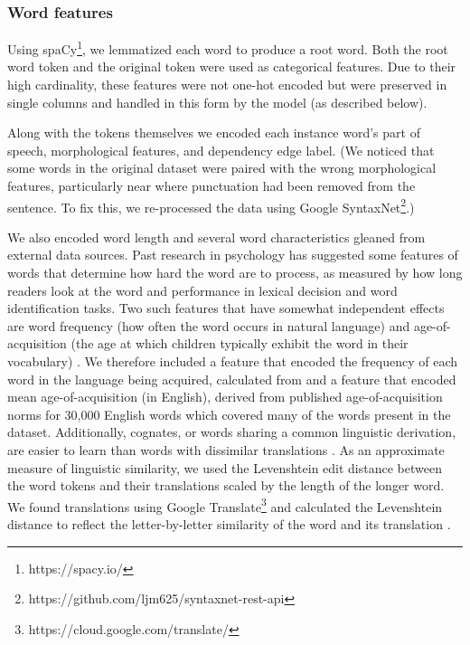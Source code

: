 \documentclass[11pt,a4paper]{article}
\begin{document}
\subsubsection{Word features}

Using spaCy\footnote{https://spacy.io/}, we lemmatized each word to produce a root word. Both the root
word token and the original token were used as categorical features. Due to
their high cardinality, these features were not one-hot encoded but were
preserved in single columns and handled in this form by the model (as described
below).

Along with the tokens themselves we encoded each instance word's part of speech,
morphological features, and dependency edge label. (We noticed that some words
in the original dataset were paired with the wrong morphological features,
particularly near where punctuation had been removed from the sentence. To fix
this, we re-processed the data using Google SyntaxNet\footnote{https://github.com/ljm625/syntaxnet-rest-api}.)

We also encoded word length and several word characteristics gleaned from
external data sources. Past research in psychology has suggested some features of words that determine how hard the word are to process, as measured by how long readers look at the word and performance in lexical decision and word identification tasks. Two such features that have somewhat independent effects are word frequency (how often the word occurs in natural language) \cite{rayner1998eye} and age-of-acquisition (the age at which children typically exhibit the word in their vocabulary) \cite{brysbaert2011effects, ferrand2011comparing}. We therefore included a feature that encoded the frequency of each word in the language being acquired, calculated from \citet{robert_speer_2017_998161} and a feature that encoded mean age-of-acquisition (in English), derived from published age-of-acquisition norms for 30,000 English words \cite{Kuperman2012} which covered many of the words present in the dataset. Additionally, cognates, or words sharing a common linguistic derivation, are easier to learn than words with dissimilar translations \cite{de2000hard}. As an approximate measure of linguistic similarity, we used the Levenshtein edit distance between the word tokens and their translations scaled by the length of the longer word. We found translations using Google Translate\footnote{https://cloud.google.com/translate/} and calculated the Levenshtein distance to reflect the letter-by-letter similarity of the word and its translation \cite{hyyro2001explaining}. 
\end{document}
